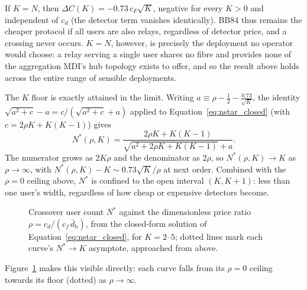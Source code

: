 \documentclass[12pt]{article}
\begin{document}
If $K=N$, then $\Delta C(K) = -0.73\,c_F\sqrt K$, negative for every $K>0$ and independent of $c_d$ (the detector term vanishes identically). BB84 thus remains the cheaper protocol if all users are also relays, regardless of detector price, and a crossing never occurs. $K=N$, however, is precisely the deployment no operator would choose: a relay serving a single user shares no fibre and provides none of the aggregation MDI's hub topology exists to offer, and so the result above holds across the entire range of sensible deployments.

The $K$ floor is exactly attained in the limit. Writing $a\equiv\rho-\tfrac12-\tfrac{0.73}{\sqrt K}$, the identity $\sqrt{a^2+c}-a=c/(\sqrt{a^2+c}+a)$ applied to Equation~\ref{eq:nstar_closed} (with $c=2\rho K+K(K-1)$) gives
\begin{equation}
    N^*(\rho,K) = \frac{2\rho K+K(K-1)}{\sqrt{a^2+2\rho K+K(K-1)}+a}.
\end{equation}
The numerator grows as $2K\rho$ and the denominator as $2\rho$, so $N^*(\rho,K)\to K$ as $\rho\to\infty$, with $N^*(\rho,K)-K\sim0.73\sqrt K/\rho$ at next order. Combined with the $\rho=0$ ceiling above, $N^*$ is confined to the open interval $(K,K{+}1)$: less than one user's width, regardless of how cheap or expensive detectors become.

\begin{figure}[hbtp]
    \centering
    
    \caption{Crossover user count $N^*$ against the dimensionless price ratio $\rho=c_d/(c_f\,\bar d_\text{b})$, from the closed-form solution of Equation~\ref{eq:nstar_closed}, for $K=2$--$5$; dotted lines mark each curve's $N^*\to K$ asymptote, approached from above.}
    \label{fig:nstar}
\end{figure}

Figure~\ref{fig:nstar} makes this visible directly: each curve falls from its $\rho=0$ ceiling towards its floor (dotted) as $\rho\to\infty$.
\end{document}
